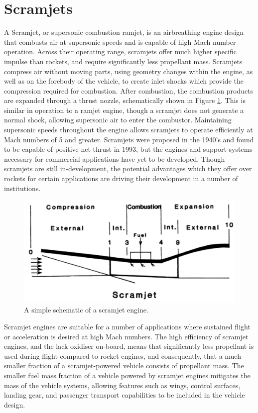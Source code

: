  
    
    \section{Scramjets}
    
    A Scramjet, or supersonic combustion ramjet, is an airbreathing engine design that combusts air at supersonic speeds and is capable of high Mach number operation. 
    Across their operating range, scramjets offer much higher specific impulse than rockets, and require significantly less propellant mass\cite{Billig1993,Cook2003}.
    Scramjets compress air without moving parts, using geometry changes within the engine\cite{Curran2001a}, as well as on the forebody of the vehicle, to create inlet shocks which provide the compression required for combustion\cite{Smart2012}. After combustion, the combustion products are expanded through a thrust nozzle, schematically shown in Figure \ref{fig:scramjet}. This is similar in operation to a ramjet engine, though a scramjet does not generate a normal shock, allowing supersonic air to enter the combustor. Maintaining supersonic speeds throughout the engine allows scramjets to operate efficiently at Mach numbers of 5 and greater. 
    Scramjets were proposed in the 1940's\cite{Curran2001} and found to be capable of positive net thrust in 1993\cite{Paull1993}, but the engines and support systems necessary for commercial applications have yet to be developed. 
    Though scramjets are still in-development, the potential advantages which they offer over rockets for certain applications are driving their development in a number of institutions\cite{Curran2001b}.
    \begin{figure}[ht]
    	\centering
    	\includegraphics[width=0.7\linewidth]{figures/2_literature-review/scramjet}
    	\caption{A simple schematic of a scramjet engine\cite{Heiser1994}.}
    	\label{fig:scramjet}
    \end{figure}
    
    Scramjet engines are suitable for a number of applications where sustained flight or acceleration is desired at high Mach numbers. 
    The high efficiency of scramjet engines, and the lack oxidiser on-board, means that significantly less propellant is used during flight compared to rocket engines, and consequently, that a much smaller fraction of a scramjet-powered vehicle consists of propellant mass\cite{Curran2003}. 
    The smaller fuel mass fraction of a vehicle powered by scramjet engines mitigates the mass of the vehicle systems, allowing features such as wings, control surfaces, landing gear, and passenger transport capabilities to be included in the vehicle design\cite{Curran2003}. 
    
